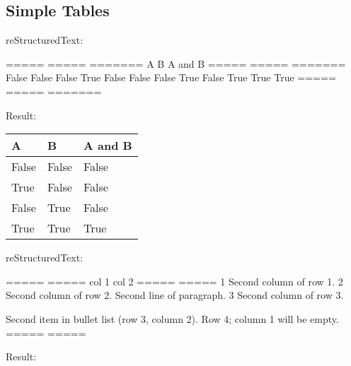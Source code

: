\documentclass[letterpaper,12pt,english]{sphinxmanual}
\begin{document}
\subsection{Simple Tables}
\label{\detokenize{rtxt:simple-tables}}
reStructuredText:

\begin{sphinxVerbatim}[commandchars=\\\{\}]
=====  =====  =======
  A      B    A and B
=====  =====  =======
False  False  False
True   False  False
False  True   False
True   True   True
=====  =====  =======
\end{sphinxVerbatim}

Result:


\begin{savenotes}\sphinxattablestart
\centering
\begin{tabulary}{\linewidth}[t]{|T|T|T|}
\hline
\sphinxstyletheadfamily 
A
&\sphinxstyletheadfamily 
B
&\sphinxstyletheadfamily 
A and B
\\
\hline
False
&
False
&
False
\\
\hline
True
&
False
&
False
\\
\hline
False
&
True
&
False
\\
\hline
True
&
True
&
True
\\
\hline
\end{tabulary}
\par
\sphinxattableend\end{savenotes}

reStructuredText:

\begin{sphinxVerbatim}[commandchars=\\\{\}]
=====  =====
col 1  col 2
=====  =====
1      Second column of row 1.
2      Second column of row 2.
       Second line of paragraph.
3      \PYGZhy{} Second column of row 3.

        Second item in bullet
         list (row 3, column 2).
\PYGZbs{}      Row 4; column 1 will be empty.
=====  =====
\end{sphinxVerbatim}

Result:
\end{document}
